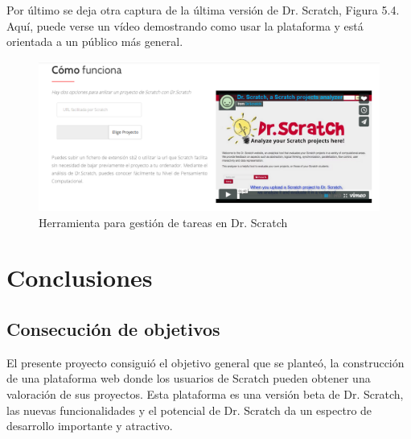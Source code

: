 \documentclass[a4paper, 12pt]{book}
\begin{document}
Por último se deja otra captura de la última versión de Dr. Scratch, Figura 5.4. Aquí,
puede verse un vídeo demostrando como usar la plataforma y está orientada a un público 
más general.

\begin{figure}
	\graphicspath{{img/}}
  \includegraphics[bb=0 0 800 600, width=14cm, keepaspectratio]{comofunciona.png}
	\caption{Herramienta para gestión de tareas en Dr. Scratch}
  \label{figura:foro_hilos}
\end{figure}





\cleardoublepage
\chapter{Conclusiones}
\label{chap:conclusiones}


\section{Consecución de objetivos}
\label{sec:consecucion-objetivos}

El presente proyecto consiguió el objetivo general que se planteó, la 
construcción de una plataforma web donde los usuarios de Scratch pueden 
obtener una valoración de sus proyectos. Esta plataforma es una versión
beta de Dr. Scratch, las nuevas funcionalidades y el potencial de Dr. 
Scratch da un espectro de desarrollo importante y atractivo. \\
\end{document}

